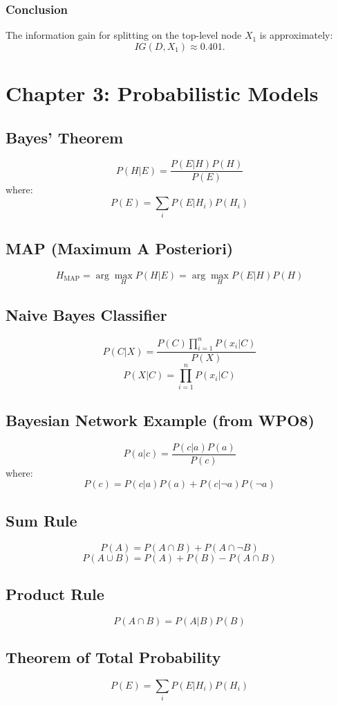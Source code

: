 \documentclass[10pt,a4paper]{article}
\begin{document}
\subsubsection*{Conclusion}
The information gain for splitting on the top-level node \(X_1\) is approximately:
\[
IG(D, X_1) \approx 0.401.
\]

\newpage
\section*{Chapter 3: Probabilistic Models}
\subsection*{Bayes' Theorem}
\[
P(H|E) = \frac{P(E|H)P(H)}{P(E)}
\]
where:
\[
P(E) = \sum_i P(E|H_i)P(H_i)
\]

\subsection*{MAP (Maximum A Posteriori)}
\[
H_{\text{MAP}} = \arg\max_H P(H|E) = \arg\max_H P(E|H)P(H)
\]

\subsection*{Naive Bayes Classifier}
\[
P(C|X) = \frac{P(C)\prod_{i=1}^{n}P(x_i|C)}{P(X)}
\]
\[
P(X|C) = \prod_{i=1}^{n}P(x_i|C)
\]

\subsection*{Bayesian Network Example (from WPO8)}
\[
P(a|c) = \frac{P(c|a)P(a)}{P(c)}
\]
where:
\[
P(c) = P(c|a)P(a) + P(c|\neg a)P(\neg a)
\]

\subsection*{Sum Rule}
\[
P(A) = P(A \cap B) + P(A \cap \neg B)
\]
\[
P(A \cup B) = P(A) + P(B) - P(A \cap B)
\]
\subsection*{Product Rule}
\[
P(A \cap B) = P(A|B)P(B)
\]

\subsection*{Theorem of Total Probability}
\[
P(E) = \sum_{i} P(E|H_i)P(H_i)
\]
\end{document}
